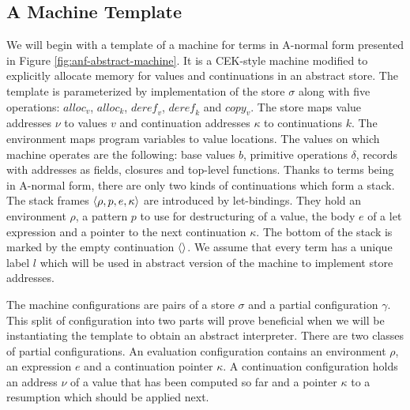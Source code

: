 \subsection*{A Machine Template}
We will begin with a template of a machine for \IDL{} terms in A-normal form presented in Figure \ref{fig:anf-abstract-machine}.
It is a CEK-style machine modified to explicitly allocate memory for values and continuations in an abstract store.
The template is parameterized by implementation of the store $\sigma$ along with five operations: $\mathit{alloc}_v$, $\mathit{alloc}_k$, $\mathit{deref}_v$, $\mathit{deref}_k$ and $\mathit{copy}_v$.
The store maps value addresses $\nu$ to values $v$ and continuation addresses $\kappa$ to continuations $k$.
The environment maps program variables to value locations.
The values on which machine operates are the following: base values $b$, primitive operations $\delta$, records with addresses as fields, closures and top-level functions.
Thanks to terms being in A-normal form, there are only two kinds of continuations which form a stack.
The stack frames $\left< \rho, p, e, \kappa \right>$ are introduced by let-bindings. They hold an environment $\rho$, a pattern $p$ to use for destructuring of a value, the body $e$ of a let expression and a pointer to the next continuation $\kappa$.
The bottom of the stack is marked by the empty continuation $\left<  \right>$.
We assume that every term has a unique label $l$ which will be used in abstract version of the machine to implement store addresses.

The machine configurations are pairs of a store $\sigma$ and a partial configuration $\gamma$.
This split of configuration into two parts will prove beneficial when we will be instantiating the template to obtain an abstract interpreter.
There are two classes of partial configurations.
An evaluation configuration contains an environment $\rho$, an expression $e$ and a continuation pointer $\kappa$.
A continuation configuration holds an address $\nu$ of a value that has been computed so far and a pointer $\kappa$ to a resumption which should be applied next.

